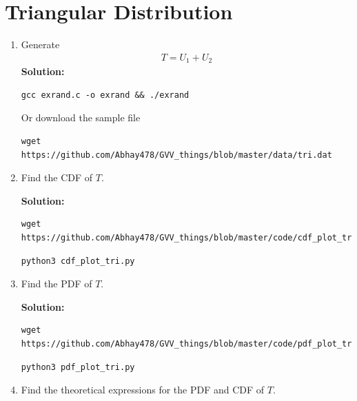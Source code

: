\documentclass[journal,12pt,twocolumn]{IEEEtran}
\renewcommand\thesection{\arabic{section}}
\theoremstyle{remark}
\newcommand{\solution}{\noindent \textbf{Solution: }}
\numberwithin{equation}{section}
\numberwithin{equation}{section}
\begin{document}
\section{Triangular Distribution}
\begin{enumerate}[label=\thesection.\arabic*,ref=\thesection.\theenumi]

\item Generate 
	\begin{align}
		T = U_1+U_2
	\end{align}
\solution

    
    \begin{lstlisting}
gcc exrand.c -o exrand && ./exrand
    \end{lstlisting}

Or download the sample file
\begin{lstlisting}
wget https://github.com/Abhay478/GVV_things/blob/master/data/tri.dat   
\end{lstlisting}

\item Find the CDF of $T$.

\solution

\begin{lstlisting}
wget https://github.com/Abhay478/GVV_things/blob/master/code/cdf_plot_tri.py
\end{lstlisting}

\begin{lstlisting}
python3 cdf_plot_tri.py
\end{lstlisting}

\item Find the PDF of $T$.

\solution 

\begin{lstlisting}
wget https://github.com/Abhay478/GVV_things/blob/master/code/pdf_plot_tri.py
\end{lstlisting}

\begin{lstlisting}
python3 pdf_plot_tri.py
\end{lstlisting}

\item Find the theoretical expressions for the PDF and CDF of $T$.


\end{enumerate}
\end{document}

